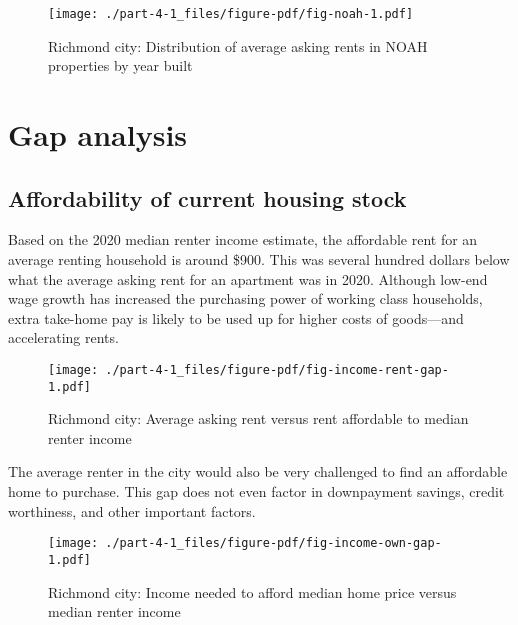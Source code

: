 \documentclass[
  letterpaper,
  DIV=11,
  numbers=noendperiod]{scrreprt}
\begin{document}
\begin{figure}

{\centering \texttt{[image: ./part-4-1\_files/figure-pdf/fig-noah-1.pdf]}

}

\caption{\label{fig-noah}Richmond city: Distribution of average asking
rents in NOAH properties by year built}

\end{figure}

\hypertarget{gap-analysis}{%
\section{Gap analysis}\label{gap-analysis}}

\hypertarget{affordability-of-current-housing-stock}{%
\subsection{Affordability of current housing
stock}\label{affordability-of-current-housing-stock}}

Based on the 2020 median renter income estimate, the affordable rent for
an average renting household is around \$900. This was several hundred
dollars below what the average asking rent for an apartment was in 2020.
Although low-end wage growth has increased the purchasing power of
working class households, extra take-home pay is likely to be used up
for higher costs of goods---and accelerating rents.

\begin{figure}

{\centering \texttt{[image: ./part-4-1\_files/figure-pdf/fig-income-rent-gap-1.pdf]}

}

\caption{\label{fig-income-rent-gap}Richmond city: Average asking rent
versus rent affordable to median renter income}

\end{figure}

The average renter in the city would also be very challenged to find an
affordable home to purchase. This gap does not even factor in
downpayment savings, credit worthiness, and other important factors.

\begin{figure}

{\centering \texttt{[image: ./part-4-1\_files/figure-pdf/fig-income-own-gap-1.pdf]}

}

\caption{\label{fig-income-own-gap}Richmond city: Income needed to
afford median home price versus median renter income}

\end{figure}
\end{document}
